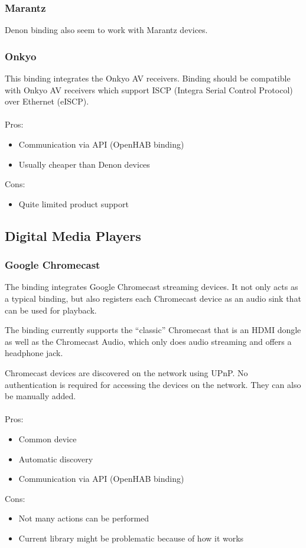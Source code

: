 \subsubsection{Marantz}
Denon binding also seem to work with Marantz devices.

\subsubsection{Onkyo}
This binding integrates the Onkyo AV receivers. Binding should be compatible with Onkyo
AV receivers which support ISCP (Integra Serial Control Protocol) over Ethernet (eISCP).\\~\\
Pros:
\begin{itemize}
	\item Communication via API (OpenHAB binding)
	\item Usually cheaper than Denon devices
\end{itemize}
Cons:
\begin{itemize}
	\item Quite limited product support
\end{itemize}

\subsection{Digital Media Players}

\subsubsection{Google Chromecast}
The binding integrates Google Chromecast streaming devices.
It not only acts as a typical binding, but also registers each Chromecast device as an audio sink that can be used for playback.

The binding currently supports the “classic” Chromecast that is an HDMI dongle as well as the Chromecast Audio, which only does
 audio streaming and offers a headphone jack.

Chromecast devices are discovered on the network using UPnP. No authentication is required for accessing the devices on the network.
They can also be manually added.\\~\\
Pros:
\begin{itemize}
	\item Common device
	\item Automatic discovery
	\item Communication via API (OpenHAB binding)
\end{itemize}
Cons:
\begin{itemize}
	\item Not many actions can be performed
	\item Current library might be problematic because of how it works
\end{itemize}

